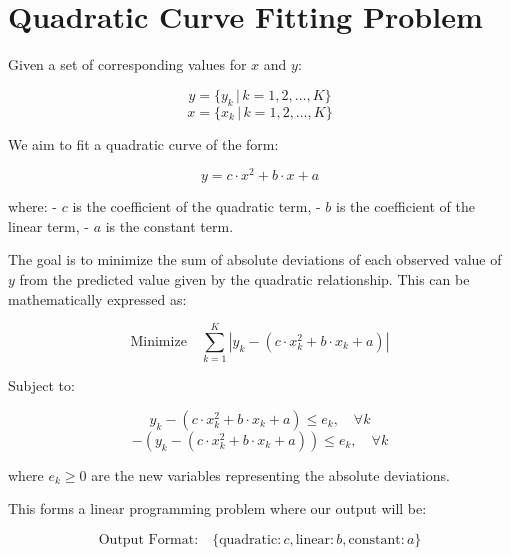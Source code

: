 \documentclass{article}
\begin{document}
\section*{Quadratic Curve Fitting Problem}

Given a set of corresponding values for \( x \) and \( y \):

\[
y = \{ y_k \,|\, k = 1, 2, \ldots, K \}
\]
\[
x = \{ x_k \,|\, k = 1, 2, \ldots, K \}
\]

We aim to fit a quadratic curve of the form:

\[
y = c \cdot x^2 + b \cdot x + a
\]

where:
- \( c \) is the coefficient of the quadratic term,
- \( b \) is the coefficient of the linear term,
- \( a \) is the constant term.

The goal is to minimize the sum of absolute deviations of each observed value of \( y \) from the predicted value given by the quadratic relationship. This can be mathematically expressed as:

\[
\text{Minimize} \quad \sum_{k=1}^{K} |y_k - (c \cdot x_k^2 + b \cdot x_k + a)|
\]

Subject to:

\[
y_k - (c \cdot x_k^2 + b \cdot x_k + a) \leq e_k, \quad \forall k
\]
\[
-(y_k - (c \cdot x_k^2 + b \cdot x_k + a)) \leq e_k, \quad \forall k
\]

where \( e_k \geq 0 \) are the new variables representing the absolute deviations.

This forms a linear programming problem where our output will be:

\[
\text{Output Format:} \quad \{ \text{quadratic}: c, \text{linear}: b, \text{constant}: a \}
\]
\end{document}
